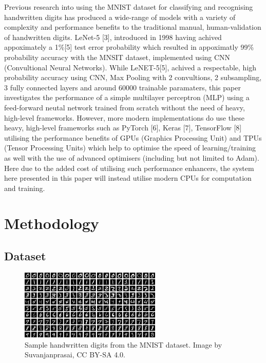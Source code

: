 \documentclass[11pt]{article}
\begin{document}
\vspace{1em}
Previous research into using the MNIST dataset for classifying and recognising handwritten digits has produced a wide-range of models with a variety of complexity and performance benefits to the traditional manual, human-validation of handwritten digits. LeNet-5 [3], introduced in 1998 having achived appoximately a 1\%[5] test error probability which resulted in appoximatly 99\% probability accuracy with the MNSIT dataset, implemented using CNN (Convultional Neural Networks). While LeNET-5[5], achived a respectable, high probability accuracy using CNN, Max Pooling with 2 convultions, 2 subsampling, 3 fully connected layers and around 60000 trainable paramaters, this paper investigates the performance of a simple multilayer perceptron (MLP) using a feed-forward neutal network trained from scratch without the need of heavy, high-level frameworks. However, more modern implementations do use these heavy, high-level frameworks such as PyTorch [6], Keras [7], TensorFlow [8] utilising the performance benefits of GPUs (Graphics Processing Unit) and TPUs (Tensor Processing Units) which help to optimise the speed of learning/training as well with the use of advanced optimisers (including but not limited to Adam). Here due to the added cost of utilising such performance enhancers, the system here presented in this paper will instead utilise modern CPUs for computation and training.

\section{Methodology}
\subsection{Dataset}
\begin{figure}[H]
  \centering
  \includegraphics[width=0.6\textwidth]{MNIST_dataset_example.png}
  \caption{Sample handwritten digits from the MNIST dataset. Image by Suvanjanprasai, CC BY-SA 4.0.}
  \label{fig:mnist}
\end{figure}
\end{document}
